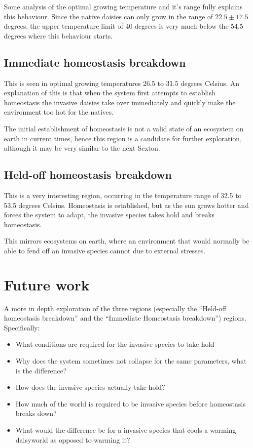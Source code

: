 \documentclass[12pt]{article}
\begin{document}
Some analysis of the optimal growing temperature and it's range fully
explains this behaviour. Since the native daisies can only grow in the
range of $22.5 \pm 17.5$ degrees, the upper temperature limit of 40
degrees is very much below the 54.5 degrees where this behaviour starts.
\subsection{Immediate homeostasis breakdown}
This is seen in optimal growing temperatures 26.5 to 31.5 degrees
Celsius. An explanation of this is that when the system first attempts
to establish homeostasis the invasive daisies take over immediately
and quickly make the environment too hot for the natives.

The initial establishment of homeostasis is not a valid state of an
ecosystem on earth in current times, hence this region is a candidate
for further exploration, although it may be very similar to the next Sexton.

\subsection{Held-off homeostasis breakdown}
This is a very interesting region, occurring in the temperature range
of 32.5 to 53.5 degrees Celsius. Homeostasis is established, but as
the sun grows hotter and forces the system to adapt, the invasive
species takes hold and breaks homeostasis.

This mirrors ecosystems on earth, where an environment that would
normally be able to fend off an invasive species cannot due to
external stresses\cite{albert2000}.

\section{Future work}
A more in depth exploration of the three regions (especially the
``Held-off homeostasis breakdown'' and the ``Immediate Homeostasis
breakdown'') regions. Specifically:
\begin{itemize}
\item What conditions are required for the invasive species to take hold
\item Why does the system sometimes not collapse for the same
  parameters, what is the difference?
\item How does the invasive species actually take hold?
\item How much of the world is required to be invasive species before
  homeostasis breaks down?
\item What would the difference be for a invasive species that cools a
  warming daisyworld as opposed to warming it?
\end{itemize}
\end{document}
